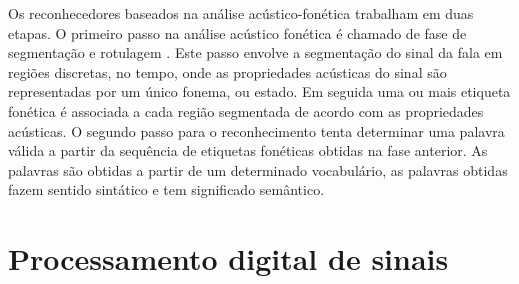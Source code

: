 Os reconhecedores baseados na análise acústico-fonética trabalham em duas etapas. O primeiro passo na análise acústico fonética é chamado de fase de segmentação e rotulagem \cite{fundRecFala}. Este passo envolve a segmentação do sinal da fala em regiões discretas, no tempo, onde as propriedades acústicas do sinal são representadas por um único fonema, ou estado. Em seguida uma ou mais etiqueta fonética é associada a cada região segmentada de acordo com as propriedades acústicas. O segundo passo para o reconhecimento tenta determinar uma palavra válida a partir da sequência de etiquetas fonéticas obtidas na fase anterior. As palavras são obtidas a partir de um determinado vocabulário, as palavras obtidas fazem sentido sintático e tem significado semântico.

\section{Processamento digital de sinais}
 
